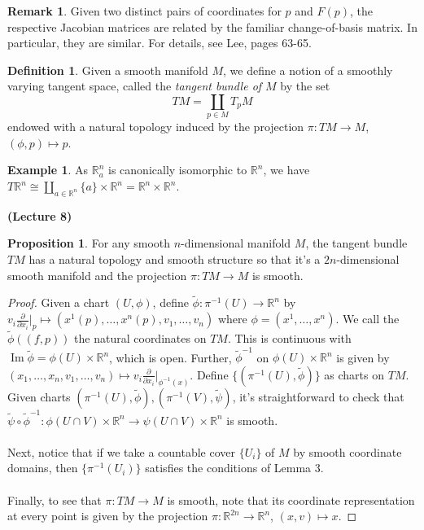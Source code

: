 \documentclass[10pt,letterpaper,cm]{nupset}
\theoremstyle{definition}
\newtheorem*{definition}{Definition}
\newtheorem{exmp}{Example}
\newtheorem{remark}{Remark}
\newtheorem{prop}{Proposition}
\DeclareMathOperator{\Ima}{Im}
\newcommand{\R}{\mathbb R}
\newcommand{\1}{\mathbf{1}}
\newcommand{\0}{\vec 0}
\begin{document}
\begin{remark}
Given two distinct pairs of coordinates for $p$ and $F(p)$, the respective Jacobian matrices are related by the familiar change-of-basis matrix. In particular, they are similar. For details, see Lee, pages 63-65.
\end{remark}

\begin{definition}
Given a smooth manifold $M$, we define a notion of a smoothly varying tangent space, called the \textit{tangent bundle of $M$} by the set  $$TM = \coprod_{p \in M} T_pM$$ endowed with a natural topology induced by the projection $\pi: TM \to M$, $(\phi, p) \mapsto p$.
\end{definition}

\begin{exmp}
As $\R_a^n$ is canonically isomorphic to $\R^n$, we have $T\R^n \cong \coprod_{a\in \R^n} \{a\} \times \R^n = \R^n \times \R^n$.
\end{exmp}

\begin{center}
{\textbf{(Lecture 8)}} 
\end{center}

\begin{prop}
For any smooth $n$-dimensional manifold $M$, the tangent bundle $TM$ has a natural topology and smooth structure so that it's a $2n$-dimensional smooth manifold and the projection $\pi : TM \to M$ is smooth.
\end{prop}
\begin{proof}
Given a chart $(U, \phi)$, define $\tilde{\phi}: \pi^{-1}(U) \to \R^n$ by $v_i\frac{\partial}{\partial{x_i}}\vert_p \mapsto (x^1(p), \ldots, x^n(p), v_1, \ldots, v_n)$ where $\phi = (x^1, \ldots, x^n)$. We call the $\tilde{\phi}((f, p))$ the natural coordinates on $TM$. This is continuous with $\Ima \tilde{\phi} = \phi(U) \times \R^n$, which is open. Further, $\tilde{\phi}^{-1}$ on $\phi(U) \times \R^n$ is given by $(x_1, \ldots, x_n, v_1, \ldots, v_n)\mapsto v_i \frac{\partial}{\partial{x_i}}\vert_{\phi^{-1}(x)}$. Define $\{(\pi^{-1}(U), \tilde{\phi})\}$ as charts on $TM$. Given charts $(\pi^{-1}(U), \tilde{\phi}), (\pi^{-1}(V), \tilde{\psi})$, it's straightforward to check that $\tilde{\psi} \circ \tilde{\phi}^{-1}: \phi(U \cap V)\times \R^n \to \psi(U \cap V)\times \R^n$ is smooth.
\\ \\
Next, notice that if we take a countable cover $\{U_i\}$ of $M$ by smooth coordinate domains, then $\{\pi^{-1}(U_i)\}$ satisfies the conditions of Lemma 3.
\\ \\
Finally, to see that $\pi : TM \to M$ is smooth, note that its coordinate representation at every point is given by the projection $\pi:\R^{2n} \to \R^n$, $(x,v) \mapsto x$.
\end{proof}
\end{document}
